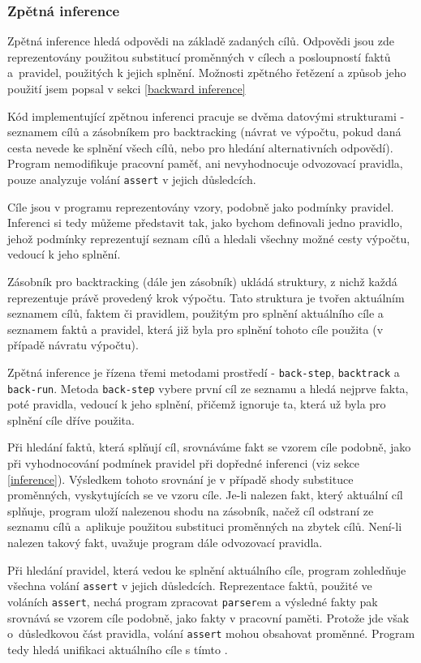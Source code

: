 \subsubsection{Zpětná inference}

Zpětná inference hledá odpovědi na základě zadaných cílů. Odpovědi jsou zde
reprezentovány použitou substitucí proměnných v cílech a posloupností faktů
a~pravidel, použitých k jejich splnění. Možnosti zpětného řetězení a způsob jeho
použití jsem popsal v sekci \ref{backward inference}

Kód implementující zpětnou inferenci pracuje se dvěma datovými strukturami -
seznamem cílů a zásobníkem pro backtracking (návrat ve výpočtu, pokud daná cesta
nevede ke splnění všech cílů, nebo pro hledání alternativních odpovědí). Program
nemodifikuje pracovní paměť, ani nevyhodnocuje odvozovací pravidla, pouze
analyzuje volání \verb|assert| v jejich důsledcích.

Cíle jsou v programu reprezentovány vzory, podobně jako podmínky pravidel.
Inferenci si tedy můžeme představit tak, jako bychom definovali jedno pravidlo,
jehož podmínky reprezentují seznam cílů a hledali všechny možné cesty výpočtu,
vedoucí k jeho splnění.

Zásobník pro backtracking (dále jen zásobník) ukládá struktury, z nichž každá
reprezentuje právě provedený krok výpočtu. Tato struktura je tvořen aktuálním
seznamem cílů, faktem či pravidlem, použitým pro splnění aktuálního cíle a
seznamem faktů a pravidel, která již byla pro splnění tohoto cíle použita (v
případě návratu výpočtu).

Zpětná inference je řízena třemi metodami prostředí - \verb|back-step|,
\verb|backtrack| a \verb|back-run|. Metoda \verb|back-step| vybere první cíl ze
seznamu a hledá nejprve fakta, poté pravidla, vedoucí k jeho splnění, přičemž
ignoruje ta, která už byla pro splnění cíle dříve použita.

Při hledání faktů, která splňují cíl, srovnáváme fakt se vzorem cíle podobně,
jako při vyhodnocování podmínek pravidel při dopředné inferenci (viz sekce
\ref{inference}). Výsledkem tohoto srovnání je v případě shody substituce
proměnných, vyskytujících se ve vzoru cíle. Je-li nalezen fakt, který aktuální
cíl splňuje, program uloží nalezenou shodu na zásobník, načež cíl odstraní ze
seznamu cílů a~aplikuje použitou substituci proměnných na zbytek cílů. Není-li
nalezen takový fakt, uvažuje program dále odvozovací pravidla.

Při hledání pravidel, která vedou ke splnění aktuálního cíle, program zohledňuje
všechna volání \verb|assert| v jejich důsledcích. Reprezentace faktů, použité ve
voláních \verb|assert|, nechá program zpracovat \verb|parser|em a výsledné fakty
pak srovnává se vzorem cíle podobně, jako fakty v pracovní paměti. Protože jde
však o~důsledkovou část pravidla, volání \verb|assert| mohou obsahovat proměnné.
Program tedy hledá unifikaci aktuálního cíle s tímto .

